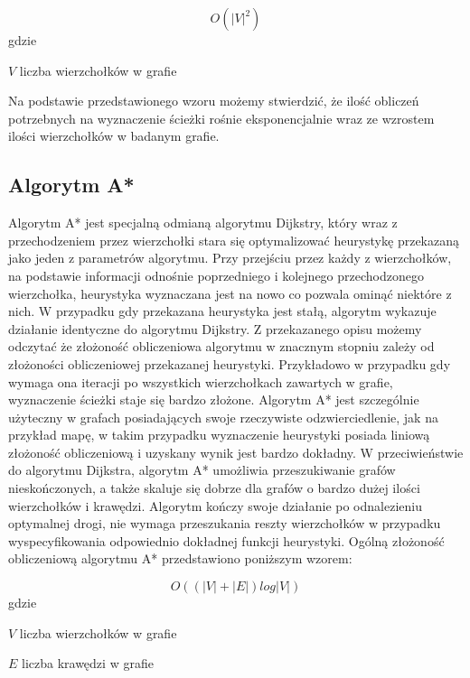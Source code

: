 \begin{equation}
O(|V|^2)
\end{equation}
gdzie
\begin{eqwhere}[2cm]
	\item[$V$] liczba wierzchołków w grafie 
\end{eqwhere}

Na podstawie przedstawionego wzoru możemy stwierdzić, że ilość obliczeń potrzebnych na wyznaczenie ścieżki rośnie eksponencjalnie wraz ze wzrostem ilości wierzchołków w badanym grafie.

\subsection{Algorytm A*}

Algorytm A* jest specjalną odmianą algorytmu Dijkstry, który wraz z przechodzeniem przez wierzchołki stara się optymalizować heurystykę przekazaną jako jeden z parametrów algorytmu. Przy przejściu przez każdy z wierzchołków, na podstawie informacji odnośnie poprzedniego i kolejnego przechodzonego wierzchołka, heurystyka wyznaczana jest na nowo co pozwala ominąć niektóre z nich. W przypadku gdy przekazana heurystyka jest stałą, algorytm wykazuje działanie identyczne do algorytmu Dijkstry. Z przekazanego opisu możemy odczytać że złożoność obliczeniowa algorytmu w znacznym stopniu zależy od złożoności obliczeniowej przekazanej heurystyki. Przykładowo w przypadku gdy wymaga ona iteracji po wszystkich wierzchołkach zawartych w grafie, wyznaczenie ścieżki staje się bardzo złożone. Algorytm A* jest szczególnie użyteczny w grafach posiadających swoje rzeczywiste odzwierciedlenie, jak na przykład mapę, w takim przypadku wyznaczenie heurystyki posiada liniową złożoność obliczeniową i uzyskany wynik jest bardzo dokładny.
W przeciwieństwie do algorytmu Dijkstra, algorytm A* umożliwia przeszukiwanie grafów nieskończonych, a także skaluje się dobrze dla grafów o bardzo dużej ilości wierzchołków i krawędzi. Algorytm kończy swoje działanie po odnalezieniu optymalnej drogi, nie wymaga przeszukania reszty wierzchołków w przypadku wyspecyfikowania odpowiednio dokładnej funkcji heurystyki. Ogólną złożoność obliczeniową algorytmu A* przedstawiono poniższym wzorem:\newline

\begin{equation}
O((|V| + |E|) log |V|)
\end{equation}
gdzie
\begin{eqwhere}[2cm]
	\item[$V$] liczba wierzchołków w grafie 
	\item[$E$] liczba krawędzi w grafie 
\end{eqwhere}


